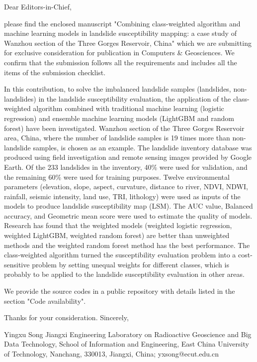 \documentclass[a4paper,fleqn]{cas-sc}
\begin{document}
\begin{coverletter}

Dear Editors-in-Chief,
\newline

please find the enclosed manuscript "Combining class-weighted algorithm and machine learning models in landslide susceptibility mapping: a case study of Wanzhou section of the Three Gorges Reservoir, China" which we are submitting for exclusive consideration for publication in Computers \& Geosciences. We confirm that the submission follows all the requirements and includes all the items of the submission checklist.  
\newline

In this contribution, to solve the imbalanced landslide samples (landslides, non-landslides) in the landslide susceptibility evaluation, the application of the class-weighted algorithm combined with traditional machine learning (logistic regression) and ensemble machine learning models (LightGBM and random forest) have been investigated. 
Wanzhou section of the Three Gorges Reservoir area, China, where the number of landslide samples is 19 times more than non-landslide samples, is chosen as an example. 
The landslide inventory database was produced using field investigation and remote sensing images provided by Google Earth. 
Of the 233 landslides in the inventory, 40\% were used for validation, and the remaining 60\% were used for training purposes. Twelve environmental parameters (elevation, slope, aspect, curvature, distance to river, NDVI, NDWI, rainfall, seismic intensity, land use, TRI, lithology) were used as inputs of the models to produce landslide susceptibility map (LSM). 
The AUC value, Balanced accuracy, and Geometric mean score were used to estimate the quality of models. 
Research has found that the weighted models (weighted logistic regression, weighted LightGBM, weighted random forest) are better than unweighted methods and the weighted random forest method has the best performance. 
The class-weighted algorithm turned the susceptibility evaluation problem into a cost-sensitive problem by setting unequal weights for different classes, which is probably to be applied to the landslide susceptibility evaluation in other areas.
\newline

We provide the source codes in a public repository with details listed in the section "Code availability".
\newline

Thanks for your consideration. 
\newline
Sincerely,
\newline

Yingxu Song
\newline
Jiangxi Engineering Laboratory on Radioactive Geoscience and Big Data Technology, School of Information and Engineering, East China University of Technology, Nanchang, 330013, Jiangxi, China; yxsong@ecut.edu.cn
\end{coverletter}
\end{document}
